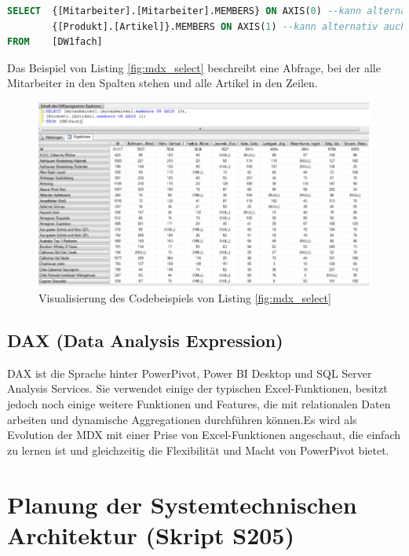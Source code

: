 \documentclass[a4paper, 11pt, nofootinbib]{article}
\begin{document}
\begin{lstlisting}[language=sql, captionpos=b, caption={Beispiel MDX' SELECT}, label={fig:mdx_select}]
SELECT 	{[Mitarbeiter].[Mitarbeiter].MEMBERS} ON AXIS(0) --kann alternativ auch als '0' oder 'COLUMNS' geschrieben werden.
		{[Produkt].[Artikel]}.MEMBERS ON AXIS(1) --kann alternativ auch als '1' oder 'ROWS' geschrieben werden.
FROM	[DW1fach]
\end{lstlisting}

Das Beispiel von Listing \ref{fig:mdx_select} beschreibt eine Abfrage, bei der alle Mitarbeiter in den Spalten stehen und alle Artikel in den Zeilen.

\begin{figure}[htb]
	\centering
	\includegraphics[keepaspectratio=true,height=17\baselineskip]{mdx.jpg}
	\caption{Visualisierung des Codebeispiels von Listing \ref{fig:mdx_select}}
	\label{fig:mdx}
\end{figure}


\subsection{DAX (Data Analysis Expression)}
DAX ist die Sprache hinter PowerPivot, Power BI Desktop und SQL Server Analysis Services. Sie verwendet einige der typischen Excel-Funktionen, besitzt jedoch noch einige weitere Funktionen und Features, die mit relationalen Daten arbeiten und dynamische Aggregationen durchführen können.Es wird als Evolution der MDX mit einer Prise von Excel-Funktionen angeschaut, die einfach zu lernen ist und gleichzeitig die Flexibilität und Macht von PowerPivot bietet. 

\section{Planung der Systemtechnischen Architektur (Skript S205)}
\end{document}
